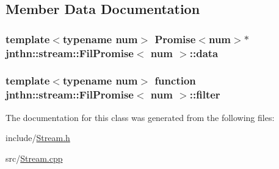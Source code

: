 \subsection{Member Data Documentation}
\hypertarget{classjnthn_1_1stream_1_1FilPromise_a96afb6c0553a74adf34c1fc2985e7c7e}{
\subsubsection[{data}]{\setlength{\rightskip}{0pt plus 5cm}template$<$typename num$>$ {\bf Promise}$<$num$>$$\ast$ {\bf jnthn\-::stream\-::\-Fil\-Promise}$<$ num $>$\-::data\hspace{0.3cm}{\ttfamily [protected]}}}\label{classjnthn_1_1stream_1_1FilPromise_a96afb6c0553a74adf34c1fc2985e7c7e}
\hypertarget{classjnthn_1_1stream_1_1FilPromise_abc2f868bf42fad27cda77e62d2b76cc7}{
\subsubsection[{filter}]{\setlength{\rightskip}{0pt plus 5cm}template$<$typename num$>$ {\bf function} {\bf jnthn\-::stream\-::\-Fil\-Promise}$<$ num $>$\-::filter\hspace{0.3cm}{\ttfamily [protected]}}}\label{classjnthn_1_1stream_1_1FilPromise_abc2f868bf42fad27cda77e62d2b76cc7}


The documentation for this class was generated from the following files\-:\begin{DoxyCompactItemize}
\item 
include/\hyperlink{Stream_8h}{Stream.\-h}\item 
src/\hyperlink{Stream_8cpp}{Stream.\-cpp}\end{DoxyCompactItemize}
